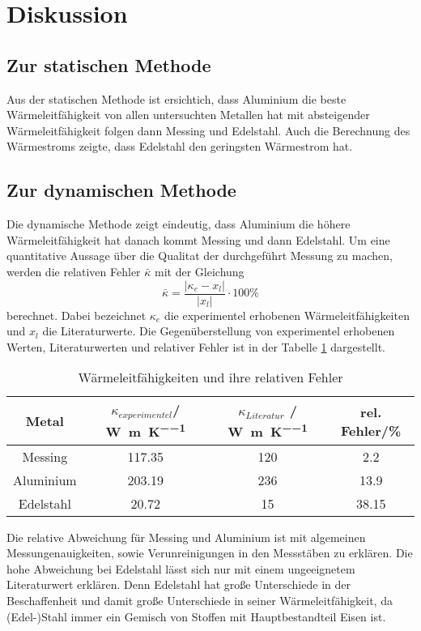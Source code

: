 \section{Diskussion}
\label{sec:Diskussion}
\subsection{Zur statischen Methode}
Aus der statischen Methode ist ersichtich, dass Aluminium die beste
Wärmeleitfähigkeit von allen untersuchten Metallen hat mit absteigender
Wärmeleitfähigkeit folgen dann Messing und Edelstahl. Auch die Berechnung des
Wärmestroms zeigte, dass Edelstahl den geringsten Wärmestrom hat.
\subsection{Zur dynamischen Methode}
Die dynamische Methode zeigt eindeutig, dass Aluminium die höhere
Wärmeleitfähigkeit hat danach kommt Messing und dann Edelstahl.
Um eine quantitative Aussage über die Qualitat der durchgeführt Messung zu
machen, werden die relativen Fehler $\bar{\kappa}$ mit der Gleichung
\begin{equation*}
  \bar{\kappa} = \frac{\lvert \kappa_e - x_l\rvert}{\lvert x_l\rvert} \cdot 100 \%
\end{equation*}
berechnet. Dabei bezeichnet $\kappa_e$ die experimentel erhobenen
Wärmeleitfähigkeiten und $x_l$ die Literaturwerte. Die Gegenüberstellung
von experimentel erhobenen Werten, Literaturwerten und relativer Fehler ist in
der Tabelle \ref{tab:rf} dargestellt.
\begin{table}
  \centering
  \caption{Wärmeleitfähigkeiten und ihre relativen Fehler}
  \begin{tabular}{c c c c}
    \toprule
    Metal & $\kappa_{experimentel}$/ \si{\watt\per\meter\per\kelvin}
    & $\kappa_{Literatur}$ / \si{\watt\per\meter\per\kelvin}
    & rel. Fehler/\si{\percent} \\
    \midrule
      Messing & 117.35 & 120 & 2.2  \\
      Aluminium & 203.19 & 236 & 13.9 \\
      Edelstahl & 20.72 & 15 & 38.15 \\
    \bottomrule
  \end{tabular}
  \label{tab:rf}
\end{table}
\FloatBarrier
Die relative Abweichung für Messing und Aluminium ist mit algemeinen Messungenauigkeiten,
sowie Verunreinigungen in den Messstäben zu erklären. Die hohe Abweichung bei
Edelstahl lässt sich nur mit einem ungeeignetem Literaturwert erklären.
Denn Edelstahl hat große Unterschiede in der Beschaffenheit und damit große
Unterschiede in seiner Wärmeleitfähigkeit, da (Edel-)Stahl immer ein Gemisch von
Stoffen mit Hauptbestandteil Eisen ist.
